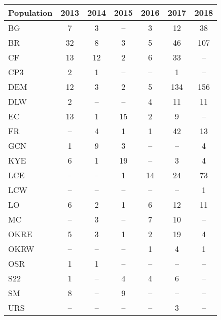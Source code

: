 \documentclass[varwidth=\maxdimen,border=1pt]{standalone}
\begin{document}
 
\begin{tabular}{lcccccc}
  \hline
Population & 2013 & 2014 & 2015 & 2016 & 2017 & 2018 \\ 
  \hline
BG &   7 &   3 & -- &   3 &  12 &  38 \\ 
  BR &  32 &   8 &   3 &   5 &  46 & 107 \\ 
  CF &  13 &  12 &   2 &   6 &  33 & -- \\ 
  CP3 &   2 &   1 & -- & -- &   1 & -- \\ 
  DEM &  12 &   3 &   2 &   5 & 134 & 156 \\ 
  DLW &   2 & -- & -- &   4 &  11 &  11 \\ 
  EC &  13 &   1 &  15 &   2 &   9 & -- \\ 
  FR & -- &   4 &   1 &   1 &  42 &  13 \\ 
  GCN &   1 &   9 &   3 & -- & -- &   4 \\ 
  KYE &   6 &   1 &  19 & -- &   3 &   4 \\ 
  LCE & -- & -- &   1 &  14 &  24 &  73 \\ 
  LCW & -- & -- & -- & -- & -- &   1 \\ 
  LO &   6 &   2 &   1 &   6 &  12 &  11 \\ 
  MC & -- &   3 & -- &   7 &  10 & -- \\ 
  OKRE &   5 &   3 &   1 &   2 &  19 &   4 \\ 
  OKRW & -- & -- & -- &   1 &   4 &   1 \\ 
  OSR &   1 &   1 & -- & -- & -- & -- \\ 
  S22 &   1 & -- &   4 &   4 &   6 & -- \\ 
  SM &   8 & -- &   9 & -- & -- & -- \\ 
  URS & -- & -- & -- & -- &   3 & -- \\ 
     \hline
\end{tabular}

 
\end{document}
